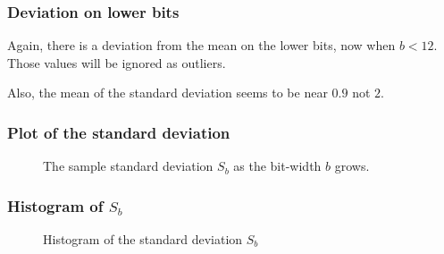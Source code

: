 \documentclass[serif, 12pt]{beamer}
\begin{document}

\begin{frame}

\frametitle{Deviation on lower bits}

Again, there is a deviation from the mean on the lower bits, now when $b < 12$.  
Those values will be ignored as outliers.

Also, the mean of the standard deviation seems to be near $0.9$ not $2$.


\end{frame}


\begin{frame}

\frametitle{Plot of the standard deviation}

\begin{figure}[h]
	\caption{The sample standard deviation $S_b$ as the bit-width $b$ grows.}
	\label{fig:errhh}
\end{figure}

\end{frame}


\begin{frame}

\frametitle{Histogram of $S_b$}

\begin{figure}[h]
	\label{fig:errhh}
	\caption{Histogram of the standard deviation $S_b$}
\end{figure}

\end{frame}
\end{document}
